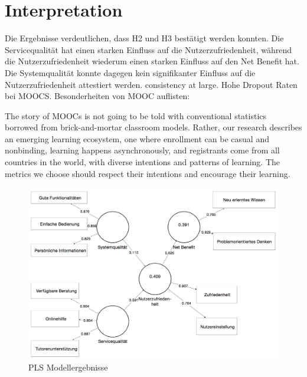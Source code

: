 \section{Interpretation}
\label{sec:vergleich}
Die Ergebnisse verdeutlichen, dass H2 und H3 bestätigt werden konnten. Die Servicequalität hat einen starken Einfluss auf die Nutzerzufriedenheit, während die Nutzerzufriedenheit wiederum einen starken Einfluss auf den Net Benefit hat. Die Systemqualität konnte dagegen kein signifikanter Einfluss auf die Nutzerzufriedenheit attestiert werden.  
\todo consistency at large. 
Hohe Dropout Raten bei MOOCS. Besonderheiten von MOOC auflisten: 


The story of MOOCs is not going to be told with conventional statistics borrowed from brick-and-mortar classroom models. Rather, our research describes an emerging learning ecosystem, one where enrollment can be casual and nonbinding, learning happens asynchronously, and registrants come from all countries in the world, with diverse intentions and patterns of learning. The metrics we choose should respect their intentions and encourage their learning.\parencite{reich2014tricky}


\begin{figure}[h]
\centering
\includegraphics[width=1\textwidth]{Grafiken/pls_bw_2.png}
\caption{PLS Modellergebnisse}
\label{PLS Modellergebnisse}
\end{figure}